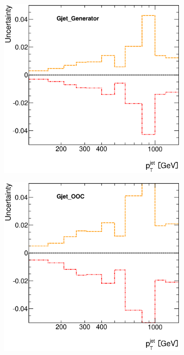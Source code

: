 \documentclass[12pt, twoside]{article}
\numberwithin{equation}{section}
\numberwithin{figure}{section}
\newenvironment{changemargin}[2]{%
\begin{list}{}{%
\setlength{\topsep}{0pt}%
\setlength{\leftmargin}{#1}%
\setlength{\rightmargin}{#2}%
\setlength{\listparindent}{\parindent}%
\setlength{\itemindent}{\parindent}%
\setlength{\parsep}{\parskip}%
}%
\item[]}{\end{list}}
\begin{document}
\begin{figure}[H]
\begin{changemargin}{-1.0cm}{-0.75cm}
\begin{changemargin}{-0.75cm}{-1.0cm}
\begin{subfigure}[b]{0.25\textwidth}
        \end{subfigure}
        \begin{subfigure}[b]{0.25\textwidth}
            \includegraphics[width=\textwidth]{./images/JetSystematics/JetSystematic-7.eps}
        \end{subfigure}
        \begin{subfigure}[b]{0.25\textwidth}
            \includegraphics[width=\textwidth]{./images/JetSystematics/JetSystematic-8.eps}
        \end{subfigure}


\end{changemargin}
\end{changemargin}
\end{figure}
\end{document}
